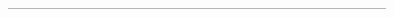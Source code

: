 \documentclass[11pt]{scrartcl}
\begin{document}
\pagecolor{BlackWhite}

\setlength\parindent{0ex}
\begin{adjustwidth}{0.5in}{0in}
	\begin{center}
	
	\vspace*{0.4cm}
	
	\end{center}
	
	\vspace*{2cm}
	
	\BackDescription

	\vspace*{0.1cm}
	\begin{center}
	---------------------------------------------------------------------------------
	\end{center}
	\vspace*{0.1cm}
%	
%		
    \AuthorBio
\end{adjustwidth}
\end{document}
